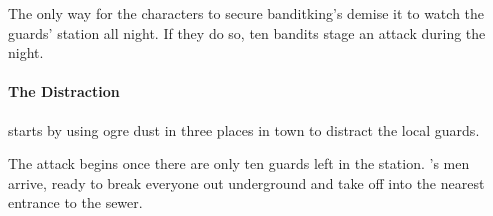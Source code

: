 
The only way for the characters to secure \gls{banditking}'s demise it to watch the guards' station all night.
If they do so, ten bandits stage an attack during the night.

\paragraph{The Distraction} starts by using ogre dust in three places in town to distract the local guards.

The attack begins once there are only ten guards left in the station.
's men arrive, ready to break everyone out underground and take off into the nearest entrance to the sewer.

\stopcontents[sq]


